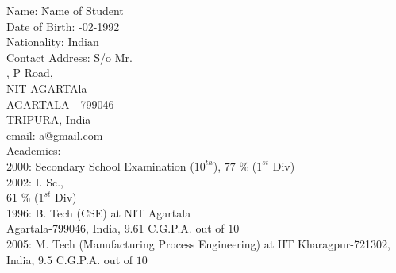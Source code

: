 \begin{tabbing}
Name: \hskip 0.8in \=Name of Student \\
Date of Birth: -02-1992 \\
Nationality:  \>Indian \\
Contact Address: \> S/o Mr.   \\
                 , P Road, \\
		 \> NIT AGARTAla     \\
		 \> AGARTALA - 799046  \\
		 \> TRIPURA, India \\
email:	\> a@gmail.com\\		
Academics:        \\
2000:		\> Secondary School Examination ($10^{th}$), $77$ $\%$ ($1^{st}$ Div)\\
2002:	\> I. Sc.,   \\
		\>$61$ $\%$ ($1^{st}$ Div) \\
1996:	\> B. Tech (CSE) at NIT Agartala \\
		\> Agartala-799046, India, $9.61$ C.G.P.A. out of $10$ \\
2005:	\> M. Tech (Manufacturing Process Engineering) at IIT Kharagpur-721302, \\
		\> India, $9.5$ C.G.P.A. out of $10$ \\

\end{tabbing}

